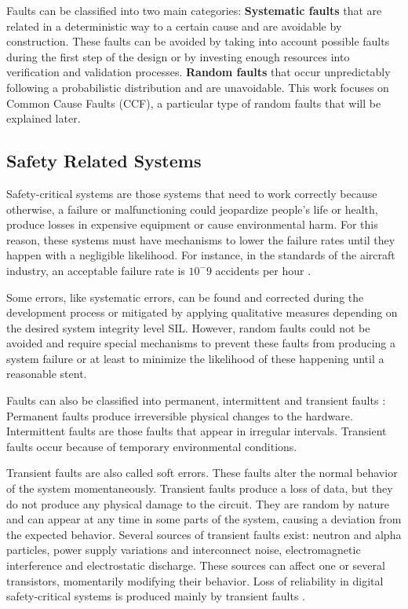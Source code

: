 Faults can be classified into two main categories: \textbf{Systematic faults} that are related in a deterministic way to a certain cause and are avoidable by construction. These faults can be avoided by taking into account possible faults during the first step of the design or by investing enough resources into verification and validation processes. \textbf{Random faults} that occur unpredictably following a probabilistic distribution and are unavoidable. This work focuses on Common Cause Faults (CCF), a particular type of random faults that will be explained later.

\bigskip


\subsection{Safety Related Systems}

Safety-critical systems are those systems that need to work correctly because otherwise, a failure or malfunctioning could jeopardize people's life or health, produce losses in expensive equipment or cause environmental harm. For this reason, these systems must have mechanisms to lower the failure rates until they happen with a negligible likelihood. For instance, in the standards of the aircraft industry, an acceptable failure rate is $10^-9$ accidents per hour \cite{bowen2000ethics}.

Some errors, like systematic errors, can be found and corrected during the development process or mitigated by applying qualitative measures depending on the desired system integrity level SIL. However, random faults could not be avoided and require special mechanisms to prevent these faults from producing a system failure or at least to minimize the likelihood of these happening until a reasonable stent.  

Faults can also be classified into permanent, intermittent and transient faults \cite{constantinescu2003trends}: Permanent faults produce irreversible physical changes to the hardware. Intermittent faults are those faults that appear in irregular intervals. Transient faults occur because of temporary environmental conditions. 

Transient faults are also called soft errors. These faults alter the normal behavior of the system momentaneously. Transient faults produce a loss of data, but they do not produce any physical damage to the circuit. They are random by nature and can appear at any time in some parts of the system, causing a deviation from the expected behavior. Several sources of transient faults exist: neutron and alpha particles, power supply variations and interconnect noise, electromagnetic interference and electrostatic discharge. These sources can affect one or several transistors, momentarily modifying their behavior. Loss of reliability in digital safety-critical systems is produced mainly by transient faults \cite{benso2003fault}. 

